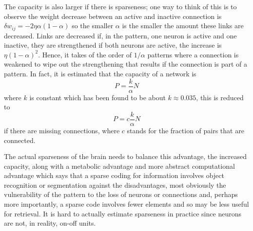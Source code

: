 \documentclass[12pt]{article}
\begin{document}
The capacity is also larger if there is sparseness; one way to think
of this is to observe the weight decrease between an active and
inactive connection is $\delta w_{ij}=-2\eta \alpha (1-\alpha)$ so the
smaller $\alpha$ is the smaller the amount these links are
decreased. Links are decreased if, in the pattern, one neuron is
active and one inactive, they are strengthened if both neurons are
active, the increase is $\eta (1-\alpha)^2$. Hence, it takes of the
order of $1/\alpha$ patterns where a connection is weakened to wipe
out the strengthening that results if the connection is part of a
pattern. In fact, it is estimated that the capacity of a network is
\begin{equation}
P=\frac{k}{\alpha}N
\end{equation}
where $k$ is constant which has been found to be about $k\approx
0.035$, this is reduced to 
\begin{equation}
P=c\frac{k}{\alpha}N
\end{equation}
if there are missing connections, where $c$ stands for the fraction of pairs that are connected.

The actual sparseness of the brain needs to balance this advantage,
the increased capacity, along with a metabolic advantage and more
abstract computational advantage which says that a sparse coding for
information involves object recognition or segmentation against the
disadvantages, most obviously the vulnerability of the pattern to the
loss of neurons or connections and, perhaps more importantly, a sparse
code involves fewer elements and so may be less useful for
retrieval. It is hard to actually estimate sparseness in practice
since neurons are not, in reality, on-off units.
\end{document}
